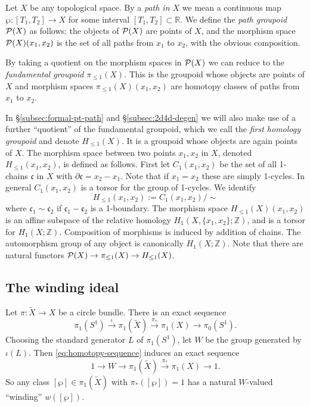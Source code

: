 \documentclass[11pt,a4paper]{article}
\def\R{{\mathbb{R}}}
\def\IZ{{\mathbb{Z}}}
\def\CP {{\cal P }}
\def\p{\partial}
\def\p{\partial}
\def\IZ{{\mathbb{Z}}}
\def\CP {{\cal P }}
\begin{document}
Let $X$ be any topological space.  By a  \emph{path in $X$} we mean a continuous map
 $\wp: [T_1,T_2] \to X$ for some interval $[T_1, T_2] \subset \R$.
We define the \emph{path groupoid} ${\CP}(X)$ as follows:  the objects of $\CP(X)$ are
points of $X$, and the morphism space
${\CP}(X)(x_1,x_2)$ is the set of
all paths from $x_1$ to $x_2$, with the obvious composition.

By taking a quotient on the morphism spaces in $\CP(X)$ we can reduce to
the \emph{fundamental groupoid} $\pi_{\leq 1}(X)$. This is the
groupoid whose objects are points of $X$ and morphism spaces
$\pi_{\leq 1}(X)(x_1,x_2)$ are homotopy classes of paths from $x_1$ to $x_2$.

In \S \ref{subsec:formal-pt-path} and \S \ref{subsec:2d4d-degen}
 we will also make use of a further ``quotient'' of the
fundamental groupoid, which we call the \emph{first homology groupoid}
and denote $H_{\leq 1}(X)$.  It is a groupoid whose objects are again points of $X$.
The morphism space between two points
$x_1,x_2$ in $X$, denoted $H_{\leq 1}(x_1,x_2)$, is defined as follows.
First let $C_1(x_1, x_2)$ be the set of all 1-chains
$\mathfrak{c}$ in $X$ with $\p \mathfrak{c} = x_2 - x_1$. Note that if $x_1=x_2$ these
are simply 1-cycles.  In general $C_1(x_1,x_2)$ is a torsor for the
group of 1-cycles. We identify
\begin{equation}
H_{\leq 1}(x_1,x_2) := C_1(x_1,x_2)/\sim
\end{equation}
where $\mathfrak{c_1} \sim \mathfrak{c_2}$ if
$\mathfrak{c_1} - \mathfrak{c_2}$ is a 1-boundary.
The morphism space $H_{\leq 1}(X)(x_1,x_2)$ is an affine
subspace of the relative homology  $H_1(X, \{ x_1, x_2\};\IZ)$, and
is a torsor for $H_1(X;\IZ)$.
Composition of morphisms is induced by addition of chains.
The automorphism group of any object is canonically
$H_1(X;\IZ)$.
Note that there are natural functors $\CP(X) \to \pi_{\leq 1}(X) \to H_{\leq 1}(X)$.


\subsection{The winding ideal}\label{subsec:WindingIdeal}

Let $\pi: \tilde X \to X$ be a circle bundle.
There is an exact sequence
\begin{equation} \label{eq:homotopy-sequence}
 \pi_1(S^1) \stackrel{\iota}{\to} \pi_1(\tilde X) \stackrel{\pi_*}{\to} \pi_1(X) \to \pi_0(S^1).
\end{equation}
Choosing the standard generator $L$ of $\pi_1(S^1)$, let $W$ be the group generated by $\iota(L)$.
Then \eqref{eq:homotopy-sequence} induces an exact sequence
\begin{equation}
 1 \to W \to \pi_1(\tilde X) \stackrel{\pi_*}{\to} \pi_1(X) \to 1.
\end{equation}
So any class $[\wp] \in \pi_1(\tilde X)$ with $\pi_*([\wp]) = 1$ has a natural $W$-valued
``winding'' $w([\wp])$.
\end{document}
